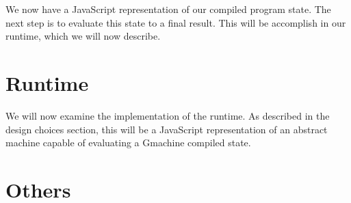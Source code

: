 We now have a JavaScript representation of our compiled program
state. The next step is to evaluate this state to a final 
result. This will be accomplish in our runtime, which we will
now describe.

\section{Runtime}
We will now examine the implementation of the runtime. As described
in the design choices section, this will be a JavaScript
representation of an abstract machine capable of evaluating 
a Gmachine compiled state. 

\section{Others}
